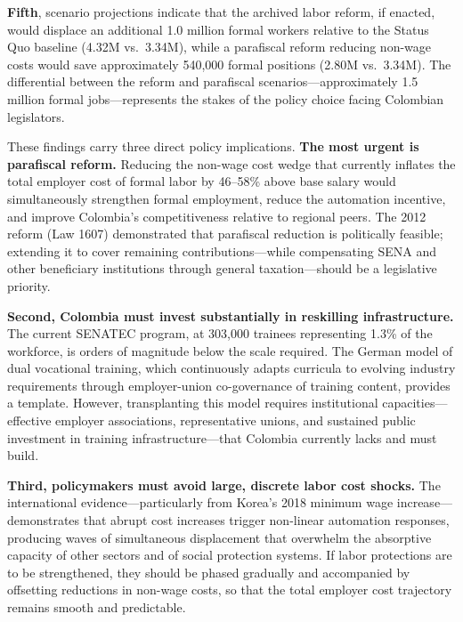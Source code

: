 \documentclass{article}
\begin{document}
\textbf{Fifth}, scenario projections indicate that the archived labor reform, if enacted, would displace an additional 1.0 million formal workers relative to the Status Quo baseline (4.32M vs.\ 3.34M), while a parafiscal reform reducing non-wage costs would save approximately 540,000 formal positions (2.80M vs.\ 3.34M). The differential between the reform and parafiscal scenarios---approximately 1.5 million formal jobs---represents the stakes of the policy choice facing Colombian legislators.

These findings carry three direct policy implications. \textbf{The most urgent is parafiscal reform.} Reducing the non-wage cost wedge that currently inflates the total employer cost of formal labor by 46--58\% above base salary would simultaneously strengthen formal employment, reduce the automation incentive, and improve Colombia's competitiveness relative to regional peers. The 2012 reform (Law 1607) demonstrated that parafiscal reduction is politically feasible; extending it to cover remaining contributions---while compensating SENA and other beneficiary institutions through general taxation---should be a legislative priority.

\textbf{Second, Colombia must invest substantially in reskilling infrastructure.} The current SENATEC program, at 303,000 trainees representing 1.3\% of the workforce, is orders of magnitude below the scale required. The German model of dual vocational training, which continuously adapts curricula to evolving industry requirements through employer-union co-governance of training content, provides a template. However, transplanting this model requires institutional capacities---effective employer associations, representative unions, and sustained public investment in training infrastructure---that Colombia currently lacks and must build.

\textbf{Third, policymakers must avoid large, discrete labor cost shocks.} The international evidence---particularly from Korea's 2018 minimum wage increase---demonstrates that abrupt cost increases trigger non-linear automation responses, producing waves of simultaneous displacement that overwhelm the absorptive capacity of other sectors and of social protection systems. If labor protections are to be strengthened, they should be phased gradually and accompanied by offsetting reductions in non-wage costs, so that the total employer cost trajectory remains smooth and predictable.
\end{document}
